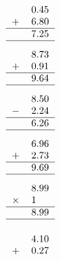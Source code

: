 \documentclass[leqno, 12pt]{article}
\begin{document}
\begin{multicols}{3}
\begin{equation}
    \raisebox{-0.8cm}{
        \begin{tabular}{c S[table-format=1.2]}
         &0.45 \tabularnewline
        $+$&6.80 \tabularnewline
        \hline
         &7.25 \tabularnewline
        \hline
    \end{tabular}}
\end{equation}
\vspace{-1pt}%
\begin{equation}
    \raisebox{-0.8cm}{
        \begin{tabular}{c S[table-format=1.2]}
         &8.73 \tabularnewline
        $+$&0.91 \tabularnewline
        \hline
         &9.64 \tabularnewline
        \hline
    \end{tabular}}
\end{equation}
\vspace{-1pt}%
\begin{equation}
    \raisebox{-0.8cm}{
        \begin{tabular}{c S[table-format=1.2]}
         &8.50 \tabularnewline
        $-$&2.24 \tabularnewline
        \hline
         &6.26 \tabularnewline
        \hline
    \end{tabular}}
\end{equation}
\vspace{-1pt}%
\begin{equation}
    \raisebox{-0.8cm}{
        \begin{tabular}{c S[table-format=1.2]}
         &6.96 \tabularnewline
        $+$&2.73 \tabularnewline
        \hline
         &9.69 \tabularnewline
        \hline
    \end{tabular}}
\end{equation}
\vspace{-1pt}%
\begin{equation}
    \raisebox{-0.8cm}{
        \begin{tabular}{c S[table-format=1.2]}
         &8.99 \tabularnewline
        $\times$&1 \tabularnewline
        \hline
         &8.99 \tabularnewline
        \hline
    \end{tabular}}
\end{equation}
\vspace{-1pt}%
\begin{equation}
    \raisebox{-0.8cm}{
        \begin{tabular}{c S[table-format=1.2]}
         &4.10 \tabularnewline
        $+$&0.27 \tabularnewline

\end{tabular}}
\end{equation}
\end{multicols}
\end{document}
